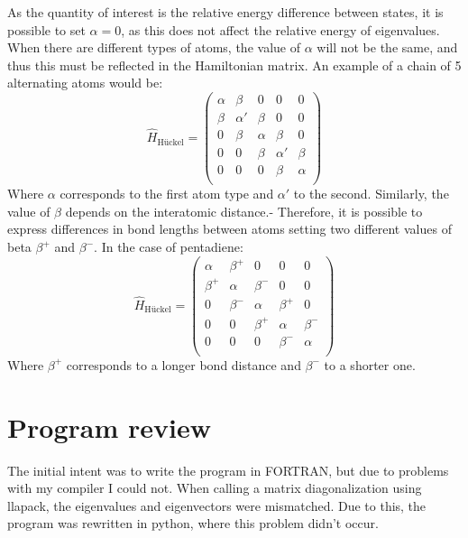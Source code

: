 \documentclass{article}
\begin{document}
As the quantity of interest is the relative energy difference between states, it is possible to set $\alpha=0$, as this does not affect the relative energy of eigenvalues. When there are different types of atoms, the value of $\alpha$ will not be the same, and thus this must be reflected in the Hamiltonian matrix. An example of a chain of 5 alternating atoms would be:
\begin{equation*}
    \hat{H}_{\textrm{Hückel}}  =
    \begin{pmatrix}
        \alpha & \beta & 0 & 0 & 0 \\
        \beta & \alpha'  & \beta & 0 & 0 \\
        0 & \beta & \alpha & \beta & 0 \\
        0 & 0 & \beta & \alpha'  & \beta \\
        0 & 0 & 0 & \beta & \alpha \\
    \end{pmatrix}
\end{equation*}
Where $\alpha$ corresponds to the first atom type and $\alpha'$ to the second. Similarly, the value of $\beta$ depends on the interatomic distance.- Therefore, it is possible to express differences in bond lengths between atoms setting two different values of beta $\beta^+$ and $\beta^-$. In the case of pentadiene: 
\begin{equation*}
    \hat{H}_{\textrm{Hückel}}  =
    \begin{pmatrix}
        \alpha & \beta^+ & 0 & 0 & 0 \\
        \beta^+ & \alpha & \beta^- & 0 & 0 \\
        0 & \beta^- & \alpha & \beta^+ & 0 \\
        0 & 0 & \beta^+ & \alpha & \beta^- \\
        0 & 0 & 0 & \beta^- & \alpha \\
    \end{pmatrix}
\end{equation*}
Where  $\beta^+$ corresponds to a longer bond distance and $\beta^-$ to a shorter one. 

\section{Program review}
The initial intent was to write the program in FORTRAN, but due to problems with my compiler I could not. When calling a matrix diagonalization using llapack, the eigenvalues and eigenvectors were mismatched. Due to this, the program was rewritten in python, where this problem didn't occur. 
\end{document}
